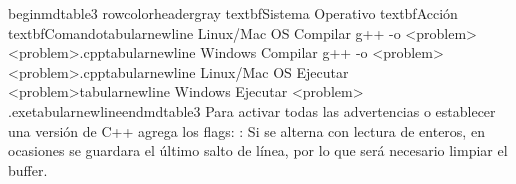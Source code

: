 {}
\markdownRendererSectionEnd \markdownRendererSectionBegin
{}\markdownRendererInterblockSeparator
{}\markdownRendererBackslash{}begin\markdownRendererLeftBrace{}mdtable3\markdownRendererRightBrace{}\markdownRendererSoftLineBreak
{}\markdownRendererBackslash{}rowcolor\markdownRendererLeftBrace{}headergray\markdownRendererRightBrace{}\markdownRendererSoftLineBreak
{}\markdownRendererBackslash{}textbf\markdownRendererLeftBrace{}Sistema Operativo\markdownRendererRightBrace{} \markdownRendererAmpersand{} \markdownRendererBackslash{}textbf\markdownRendererLeftBrace{}Acción\markdownRendererRightBrace{} \markdownRendererAmpersand{} \markdownRendererBackslash{}textbf\markdownRendererLeftBrace{}Comando\markdownRendererRightBrace{}\markdownRendererBackslash{}tabularnewline\markdownRendererSoftLineBreak
{}Linux/Mac OS \markdownRendererAmpersand{} Compilar \markdownRendererAmpersand{} g++ -o <problem> <problem>.cpp\markdownRendererBackslash{}tabularnewline\markdownRendererSoftLineBreak
{}Windows \markdownRendererAmpersand{} Compilar \markdownRendererAmpersand{} g++ -o <problem> <problem>.cpp\markdownRendererBackslash{}tabularnewline\markdownRendererSoftLineBreak
{}Linux/Mac OS \markdownRendererAmpersand{} Ejecutar \markdownRendererAmpersand{} <problem>\markdownRendererBackslash{}tabularnewline\markdownRendererSoftLineBreak
{}Windows \markdownRendererAmpersand{} Ejecutar \markdownRendererAmpersand{} <problem> .exe\markdownRendererBackslash{}tabularnewline\markdownRendererBackslash{}end\markdownRendererLeftBrace{}mdtable3\markdownRendererRightBrace{}\markdownRendererParagraphSeparator
{}Para activar todas las advertencias o establecer una versión de C++ agrega los flags:\markdownRendererParagraphSeparator
{}:\markdownRendererInterblockSeparator
{}\markdownRendererInterblockSeparator
{}
\markdownRendererSectionEnd \markdownRendererSectionBegin
{}\markdownRendererInterblockSeparator
{}\markdownRendererSectionBegin
{}\markdownRendererInterblockSeparator
{}\markdownRendererInterblockSeparator
{}\markdownRendererSectionBegin
{}\markdownRendererInterblockSeparator
{}Si se alterna con lectura de enteros, en ocasiones se guardara el último salto de línea, por lo que será necesario limpiar el buffer.\markdownRendererInterblockSeparator
